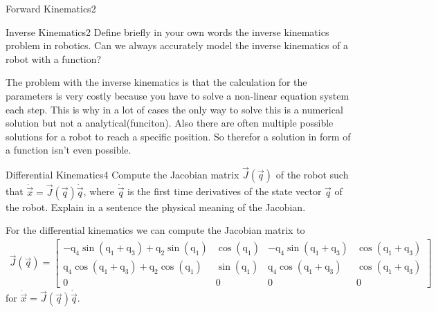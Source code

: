 \begin{questions}
\begin{question}{Forward Kinematics}{2}
\begin{answer}
\end{answer}
\end{question}


\begin{question}{Inverse Kinematics}{2}
Define briefly in your own words the inverse kinematics problem in robotics.  
Can we always accurately model the inverse kinematics of a robot with a
function?

\begin{answer}
The problem with the inverse kinematics is that the calculation for the parameters is very costly because you have to solve a non-linear equation system each step. This is why in a lot of cases the only way to solve this is a numerical solution but not a analytical(funciton). Also there are often multiple possible solutions for a robot to reach a specific position. So therefor a solution in form of a function isn't even possible.
\end{answer}

\end{question}


\begin{question}{Differential Kinematics}{4}
Compute the Jacobian matrix $\vec{J}(\vec{q})$ of the robot such that $\dot{\vec{x}}=\vec{J}(\vec{q})\dot{\vec{q}}$, where $\dot{\vec{q}}$ is the first time derivatives of the state vector $\vec{q}$ of the robot. Explain in a sentence the physical meaning of the Jacobian. 

\begin{answer}
For the differential kinematics we can compute the Jacobian matrix to
\begin{align*}
\vec{J}(\vec{q}) = 
\begin{bmatrix}
-\textrm{q}_{\textrm{4}}\sin(\textrm{q}_{\textrm{1}}+\textrm{q}_{\textrm{3}}) + \textrm{q}_{\textrm{2}}\sin(\textrm{q}_{\textrm{1}}) &
\cos(\textrm{q}_{\textrm{1}}) &
-\textrm{q}_{\textrm{4}}\sin(\textrm{q}_{\textrm{1}}+\textrm{q}_{\textrm{3}})&
\cos(\textrm{q}_{\textrm{1}}+\textrm{q}_{\textrm{3}})\\
\textrm{q}_{\textrm{4}}\cos(\textrm{q}_{\textrm{1}}+\textrm{q}_{\textrm{3}}) + \textrm{q}_{\textrm{2}}\cos(\textrm{q}_{\textrm{1}})&
\sin(\textrm{q}_{\textrm{1}})&
\textrm{q}_{\textrm{4}}\cos(\textrm{q}_{\textrm{1}}+\textrm{q}_{\textrm{3}})&
\cos(\textrm{q}_{\textrm{1}}+\textrm{q}_{\textrm{3}})\\
0 & 0 & 0 & 0 
\end{bmatrix}
\end{align*}
for $\dot{\vec{x}}=\vec{J}(\vec{q})\dot{\vec{q}}$.


\end{answer}
\end{question}
\end{questions}
